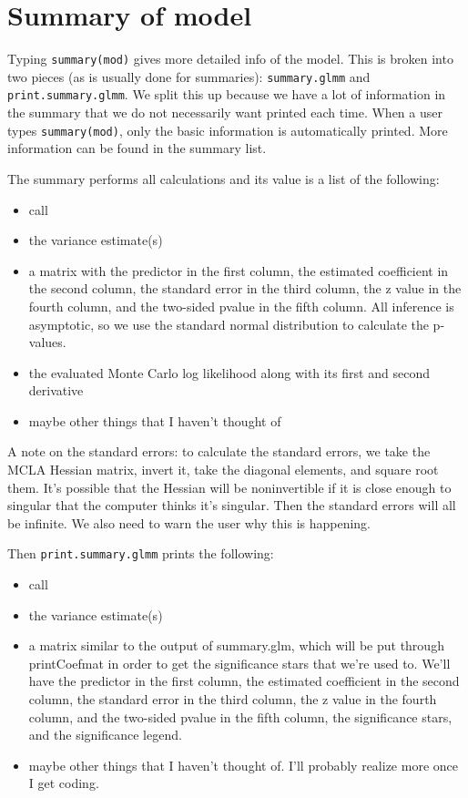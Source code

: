 \documentclass{article}
\begin{document}
\section{Summary of model}
Typing \texttt{summary(mod)}  gives more detailed info of the model. This is broken into two pieces (as is usually done for summaries):  \texttt{summary.glmm} and \texttt{print.summary.glmm}. We split this up because we have a lot of information in the summary that we do not necessarily want printed each time. When a user types \texttt{summary(mod)}, only the  basic information is automatically printed. More information can be found in the summary list.

The summary performs all calculations and its value is a list of the following:
\begin{itemize}
\item call
\item the variance estimate(s)
\item a matrix with the predictor in the first column, the estimated coefficient in the second column, the standard error in the third column, the z value in the fourth column, and the two-sided pvalue  in the fifth column. All inference is asymptotic, so we use the standard normal distribution to calculate the p-values.
\item the evaluated Monte Carlo log likelihood along with its first and second derivative
\item maybe other things that I haven't thought of
\end{itemize}

A note on the standard errors: to calculate the standard errors, we take the MCLA Hessian matrix, invert it, take the diagonal elements, and square root them. It's possible that the Hessian will be noninvertible if it is close enough to singular that the computer thinks it's singular.  Then the standard errors will all be infinite. We also need to warn the user why this is happening.

Then \texttt{print.summary.glmm}  prints the following:
\begin{itemize}
\item call
\item the variance estimate(s)
\item a matrix similar to the output of summary.glm, which will be put through printCoefmat in order to get the significance stars that we're used to. We'll have the predictor in the first column, the estimated coefficient in the second column, the standard error in the third column, the z value in the fourth column, and the two-sided pvalue  in the fifth column, the significance stars, and the significance legend.
\item maybe other things that I haven't thought of. I'll probably realize more once I get coding.
\end{itemize}
\end{document}
